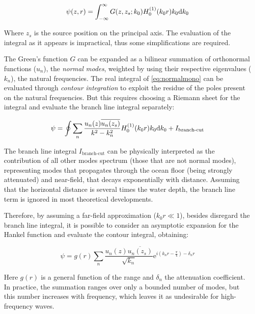  \begin{equation}
 \label{eq:normalmono}
 \psi(z,r) = \int_{-\infty}^{\infty} G(z,z_s;k_0)H_0^{(1)}(k_0r)k_0\mathrm{d} k_0
 \end{equation}
 
Where $z_s$ is the source position on the principal axis. The evaluation of the
integral as it appears is impractical, thus some simplifications are required.

The Green's function $G$ can be expanded as a bilinear summation of orthonormal
functions ($u_ n$), the \textit{normal modes}\cite{baker2003green}, weighted by
using their respective eigenvalues ($k_n$), the natural frequencies. The real
integral of \ref{eq:normalmono} can be evaluated through \textit{contour
integration} to exploit the residue of the poles present on the natural
frequencies. But this requires choosing a Riemann
sheet for the integral and evaluate the branch line integral
separately\cite{jensen2011computational,worzel1948propagation}:

\begin{equation}
\psi = \oint \sum_n{\frac{u_n(z)\overline{u_n(z_s)}}{k^2 -
k_n^2}H_0^{(1)}(k_0r)k_0\mathrm{d} k_0} + I_{\text{branch-cut}}
\end{equation}

The branch line integral $I_{\text{branch-cut}}$ can be physically interpreted
as the contribution of all other modes spectrum (those that are not
normal modes), representing modes that propagates through the ocean floor
(being strongly attenuated) and near-field, that decays exponentially with
distance. Assuming that the horizontal distance is several times the water
depth, the branch line term is ignored in most theoretical developments.

Therefore, by assuming a far-field approximation ($k_0r \ll 1$), besides
disregard the branch line integral, it is possible to consider an asymptotic expansion for the
Hankel function and evaluate the contour integral, obtaining\cite{Etter2013}:

\begin{equation}
\label{eq:normalsolution}
\psi =
g(r)\sum_n{\frac{u_n(z)\overline{u_n(z_s)}}{\sqrt{k_n}}\mathrm{e}^{i(k_nr-\tfrac{\pi}{4})-\delta_nr}}
\end{equation}

Here $g(r)$ is a general function of the range and $\delta_n$ the attenuation
coefficient. In practice, the summation ranges over only a bounded number of
modes, but this number increases with frequency, which leaves it as undesirable
for high-frequency waves. 

